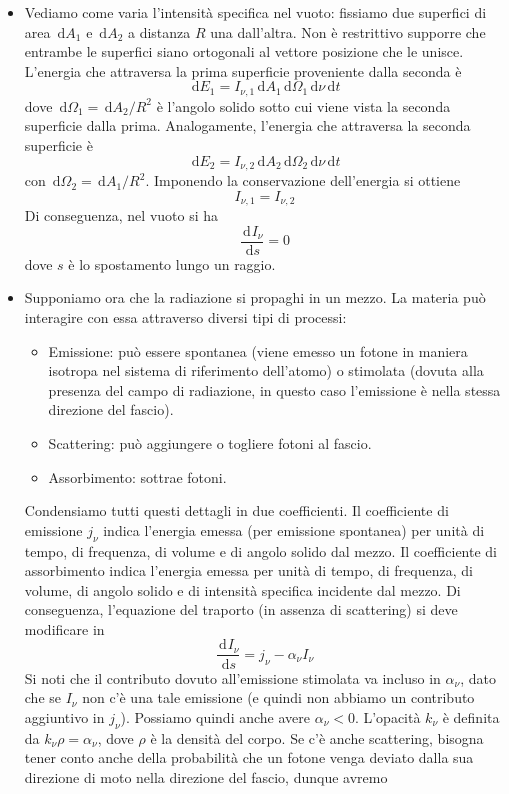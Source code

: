 \documentclass[a4paper,11pt]{article}
\renewcommand{\d}{\mathrm{d}} %
\newcommand{\der}[3][]{\frac{\d ^{#1}#2}{\d {#3}^{#1}}} %
\renewcommand{\d}{\,\mathrm{d}}
\theoremstyle{theorem}
\theoremstyle{definition}
\begin{document}
\begin{itemize}
		\item Vediamo come varia l'intensità specifica nel vuoto: fissiamo due superfici di area $\d A_1$ e $\d A_2$ a distanza $R$ una dall'altra. Non è restrittivo supporre che entrambe le superfici siano ortogonali al vettore posizione che le unisce. L'energia che attraversa la prima superficie proveniente dalla seconda è
		\[\d E_1=I_{\nu,1}\d A_1\d\Omega_1\d\nu\d t\]
		dove $\d\Omega_1=\d A_2/R^2$ è l'angolo solido sotto cui viene vista la seconda superficie dalla prima. Analogamente, l'energia che attraversa la seconda superficie è
		\[\d E_2=I_{\nu,2}\d A_2\d\Omega_2\d\nu\d t\]
		con $\d\Omega_2=\d A_1/R^2$. Imponendo la conservazione dell'energia si ottiene
		\[I_{\nu,1}=I_{\nu,2}\]
		Di conseguenza, nel vuoto si ha
		\[\der{I_\nu}{s}=0\]
		dove $s$ è lo spostamento lungo un raggio.
		\item Supponiamo ora che la radiazione si propaghi in un mezzo. La materia può interagire con essa attraverso diversi tipi di processi:
		\begin{itemize}
			\item Emissione: può essere spontanea (viene emesso un fotone in maniera isotropa nel sistema di riferimento dell'atomo) o stimolata (dovuta alla presenza del campo di radiazione, in questo caso l'emissione è nella stessa direzione del fascio).
			\item Scattering: può aggiungere o togliere fotoni al fascio.
			\item Assorbimento: sottrae fotoni.
		\end{itemize}
		Condensiamo tutti questi dettagli in due coefficienti. Il coefficiente di emissione $j_\nu$ indica l'energia emessa (per emissione spontanea) per unità di tempo, di frequenza, di volume e di angolo solido dal mezzo. Il coefficiente di assorbimento indica l'energia emessa per unità di tempo, di frequenza, di volume, di angolo solido e di intensità specifica incidente dal mezzo. Di conseguenza, l'equazione del traporto (in assenza di scattering) si deve modificare in
		\[\der{I_\nu}{s}=j_\nu-\alpha_\nu I_\nu\]
		Si noti che il contributo dovuto all'emissione stimolata va incluso in $\alpha_\nu$, dato che se $I_\nu$ non c'è una tale emissione (e quindi non abbiamo un contributo aggiuntivo in $j_\nu$). Possiamo quindi anche avere $\alpha_\nu<0$. L'opacità $k_\nu$ è definita da $k_\nu\rho=\alpha_\nu$, dove $\rho$ è la densità del corpo. Se c'è anche scattering, bisogna tener conto anche della probabilità che un fotone venga deviato dalla sua direzione di moto nella direzione del fascio, dunque avremo

\end{itemize}
\end{document}
